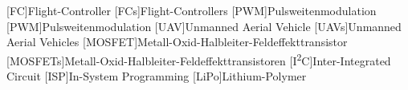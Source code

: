 [FC]{Flight-Controller}
[FCs]{Flight-Controllers}
[PWM]{Pulsweitenmodulation}
[PWM]{Pulsweitenmodulation}
[UAV]{Unmanned Aerial Vehicle}
[UAVs]{Unmanned Aerial Vehicles}
[MOSFET]{Metall-Oxid-Halbleiter-Feldeffekttransistor}
[MOSFETs]{Metall-Oxid-Halbleiter-Feldeffekttransistoren}
[I\protect\texorpdfstring{\textsuperscript{2}}{2}C]{Inter-Integrated Circuit}
[ISP]{In-System Programming}
[LiPo]{Lithium-Polymer}